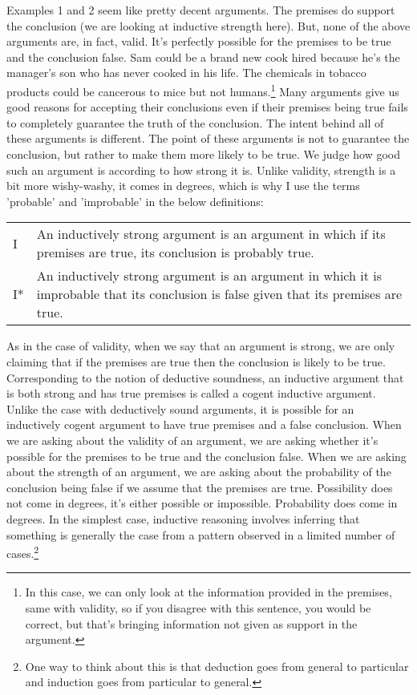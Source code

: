 Examples 1 and 2 seem like pretty decent arguments. The premises do support the conclusion (we are looking at inductive strength here). But, none of the above arguments are, in fact, valid. It's perfectly possible for the premises to be true and the conclusion false. Sam could be a brand new cook hired because he’s the manager’s son who has never cooked in his life. The chemicals in tobacco products could be cancerous to mice but not humans.\footnote{In this case, we can only look at the information provided in the premises, same with validity, so if you disagree with this sentence, you would be correct, but that's bringing information not given as support in the argument.} Many arguments give us good reasons for accepting their conclusions even if their premises being true fails to completely guarantee the truth of the conclusion.  The intent behind all of these arguments is different. The point of these arguments is not to guarantee the conclusion, but rather to make them more likely to be true.  We judge how good such an argument is according to how strong it is.  Unlike validity, strength is a bit more wishy-washy, it comes in degrees, which is why I use the terms 'probable' and 'improbable' in the below definitions:

\begin{tabular}{p{0.5in}|p{3in}}
I &An inductively strong argument is an argument in which if its premises are true, its conclusion is probably true.\\
I* &An inductively strong argument is an argument in which it is improbable that its conclusion is false given that its premises are true.
\end{tabular}

As in the case of validity, when we say that an argument is strong, we are only claiming that if the premises are true then the conclusion is likely to be true. Corresponding to the notion of deductive soundness, an inductive argument that is both strong and has true premises is called a cogent inductive argument. Unlike the case with deductively sound arguments, it is possible for an inductively cogent argument to have true premises and a false conclusion. When we are asking about the validity of an argument, we are asking whether it's possible for the premises to be true and the conclusion false. When we are asking about the strength of an argument, we are asking about the probability of the conclusion being false if we assume that the premises are true.  Possibility does not come in degrees, it's either possible or impossible. Probability does come in degrees. In the simplest case, inductive reasoning involves inferring that something is generally the case from a pattern observed in a limited number of cases.\footnote{One way to think about this is that deduction goes from general to particular and induction goes from particular to general.}

